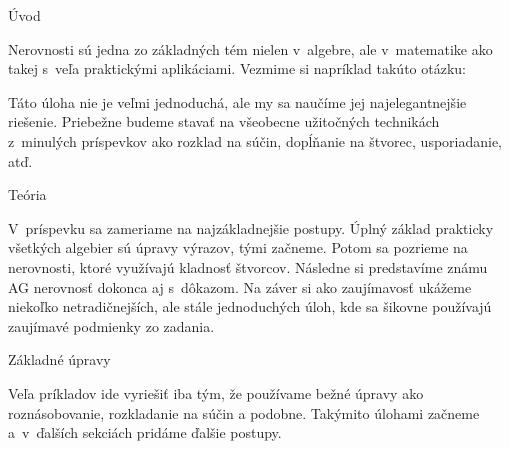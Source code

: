 




\sec Úvod

Nerovnosti sú jedna zo základných tém nielen v~algebre, ale v~matematike ako takej s~veľa praktickými aplikáciami. Vezmime si napríklad takúto otázku: 


Táto úloha nie je veľmi jednoduchá, ale my sa naučíme jej najelegantnejšie riešenie. Priebežne budeme stavať na všeobecne užitočných technikách z~minulých príspevkov ako rozklad na súčin, dopĺňanie na štvorec, usporiadanie, atď.

\sec Teória 

V~príspevku sa zameriame na najzákladnejšie postupy. Úplný základ prakticky všetkých algebier sú úpravy výrazov, tými začneme. Potom sa pozrieme na nerovnosti, ktoré využívajú kladnosť štvorcov. Následne si predstavíme známu AG nerovnosť dokonca aj s~dôkazom. Na záver si ako zaujímavosť ukážeme niekoľko netradičnejších, ale stále jednoduchých úloh, kde sa šikovne používajú zaujímavé podmienky zo zadania.

\secc Základné úpravy

Veľa príkladov ide vyriešiť iba tým, že používame bežné úpravy ako roznásobovanie, rozkladanie na súčin a podobne. Takýmito úlohami začneme a~v~ďalších sekciách pridáme ďalšie postupy.


